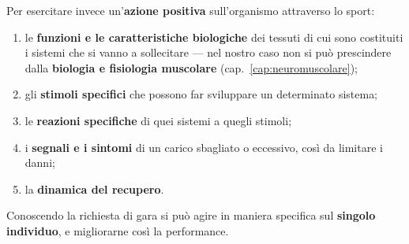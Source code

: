 Per esercitare invece un'\textbf{azione positiva} sull'organismo attraverso lo sport:
\begin{enumerate}
  \item le \textbf{funzioni e le caratteristiche biologiche} dei tessuti di cui sono costituiti i
    sistemi che si vanno a sollecitare --- nel nostro caso non si può prescindere dalla
    \textbf{biologia e fisiologia muscolare} (cap.~\ref{cap:neuromuscolare});
  \item gli \textbf{stimoli specifici} che possono far sviluppare un determinato sistema;
  \item le \textbf{reazioni specifiche} di quei sistemi a quegli stimoli;
  \item i \textbf{segnali e i sintomi} di un carico sbagliato o eccessivo, così da limitare i
    danni;
  \item la \textbf{dinamica del recupero}.
\end{enumerate}
Conoscendo la richiesta di gara si può agire in maniera specifica sul \textbf{singolo individuo}, e
migliorarne così la performance.
